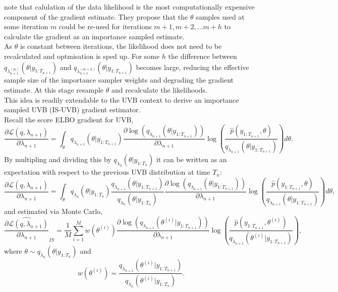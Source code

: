 \documentclass[12pt,a4paper]{article}\usepackage[]{graphicx}\usepackage[]{color}
\begin{document}
\citet{Sakaya2017} note that calulation of the data likelihood is the most computationally expensive component of the gradient estimate. They propose that the $\theta$ samples used at some iteration $m$ could be re-used for iterations $m + 1, m + 2, \ldots m + h$ to calculate the gradient as an importance sampled estimate. 
\\

As $\theta$ is constant between iterations, the likelihood does not need to be recalculated and optmisation is sped up. For some $h$ the difference between $q_{\lambda_{n+1}^{(m)}}(\theta | y_{1:T_{n+1}})$ and $q_{\lambda_{n+1}^{(m+h)}}(\theta | y_{1:T_{n+1}})$ becomes large, reducing the effective sample size of the importance sampler weights and degrading the gradient estimate. At this stage \citet{Sakaya2017} resample $\theta$ and recalculate the likelihoods.
\\

This idea is readily extendable to the UVB context to derive an importance sampled UVB (IS-UVB) gradient estimator.
\\

Recall the score ELBO gradient for UVB,
\begin{equation}
\label{UVBIS:scoreGrad}
\frac{\partial\mathcal{L}(q, \lambda_{n+1})}{\partial \lambda_{n+1}} = \int_{\theta} q_{\lambda_{n+1}}(\theta | y_{1:T_{n+1}}) \frac{\partial \log(q_{\lambda_{n+1}}(\theta | y_{1:T_{n+1}}))}{\partial \lambda_{n+1}} \log \left(\frac{\hat{p}(y_{1:T_{n+1}}, \theta)}{q_{\lambda_{n+1}}(\theta | y_{1:T_{n+1}})} \right) d\theta.
\end{equation}
By multipling and dividing this by $q_{\lambda_n}(\theta | y_{1:T_n})$ it can be written as an expectation with respect to the previous UVB distribution at time $T_n$:
\begin{equation}
\label{UVBIS:scoreGradIS}
\frac{\partial\mathcal{L}(q, \lambda_{n+1})}{\partial \lambda_{n+1}} = \int_{\theta} q_{\lambda_{n}}(\theta | y_{1:T_{n}})\frac{q_{\lambda_{n+1}}(\theta | y_{1:T_{n+1}})}{q_{\lambda_{n}}(\theta | y_{1:T_{n}})} \frac{\partial \log(q_{\lambda_{n+1}}(\theta | y_{1:T_{n+1}}))}{\partial \lambda_{n+1}} \log \left(\frac{\hat{p}(y_{1:T_{n+1}}, \theta)}{q_{\lambda_{n+1}}(\theta | y_{1:T_{n+1}})} \right) d\theta,
\end{equation}
and estimated via Monte Carlo,
\begin{equation}
\label{UVBIS:scoreEstIS}
\widehat{\frac{\partial\mathcal{L}(q, \lambda_{n+1})}{\partial \lambda_{n+1}}}_{IS} = \frac{1}{M} \sum_{i=1}^M w(\theta^{(i)})\frac{\partial \log(q_{\lambda_{n+1}}(\theta^{(i)} | y_{1:T_{n+1}}))}{\partial \lambda_{n+1}} \log \left(\frac{\hat{p}(y_{1:T_{n+1}}, \theta^{(i)})}{q_{\lambda_{n+1}}(\theta^{(i)} | y_{1:T_{n+1}})} \right),
\end{equation}
where $\theta \sim q_{\lambda_{n}}(\theta | y_{1:{T_n}})$ and 
\begin{equation}
w(\theta^{(i)}) = \frac{q_{\lambda_{n+1}}(\theta^{(i)} | y_{1:T_{n+1}})}{q_{\lambda_{n}}(\theta^{(i)} | y_{1:T_{n}})}.
\end{equation}
\end{document}
